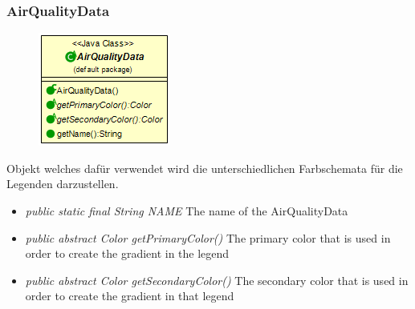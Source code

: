 \subsubsection{AirQualityData}
\begin{minipage}{0.3\textwidth}
    \begin{figure}[H]
        \includegraphics[scale = 0.5
        ]{media/view/airquality/AirQualityData_Class.png}
    \end{figure}
    \end{minipage} \hfill
    \begin{minipage}{0.6\textwidth}
Objekt welches dafür verwendet wird die unterschiedlichen Farbschemata für die Legenden darzustellen.
\end{minipage}
\begin{itemize} [noitemsep]
    \item \emph{public static final String NAME} The name of the AirQualityData
    \item \emph{public abstract Color getPrimaryColor()} The primary color that is used in order to create the gradient in the legend
    \item \emph{public abstract Color getSecondaryColor()} The secondary color that is used in order to create the gradient in that legend
\end{itemize}

